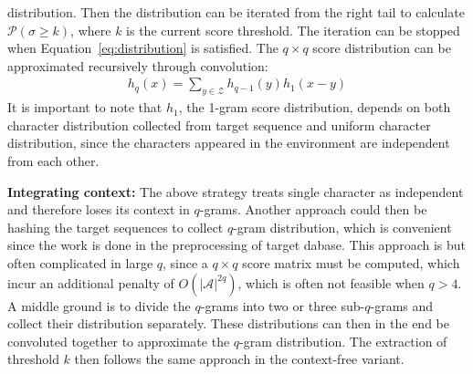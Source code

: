 \documentclass[twoside,a4paper,bsc]{master}
\newcommand{\Qgram}[1]{\(#1\)-gram}
\newcommand{\Alpha}[0]{\mathcal{A}}
\begin{document}
distribution. Then the distribution can be iterated from the right tail to
calculate \(\mathcal{P}(\sigma \geq k)\), where \(k\) is the current score
threshold. The iteration can be stopped when Equation~\ref{eq:distribution}
is satisfied.
The \(q\times q\) score distribution can be approximated recursively
through convolution:
\begin{align}
h_{q}(x) = \sum_{y\in\mathcal{Z}} h_{q-1}(y)h_1(x-y)
\label{equation:convolution}
\end{align}
It is important to note that \(h_1\), the 1-gram score distribution,
depends on both character distribution collected from target sequence and
uniform character distribution, since the characters appeared in the
environment are independent from each other.

\textbf{Integrating context:} The above strategy treats single character as
independent and therefore loses its context in \Qgram{q}s. Another
approach could then be hashing the target sequences to collect \Qgram{q}
distribution, which is convenient since the work is done in the
preprocessing of target dabase. This approach is but often complicated in
large \(q\), since a \(q\times q\) score matrix must be computed, which
incur an additional penalty of \(O(|\Alpha|^{2q})\), which is often
not feasible when \(q>4\). A middle ground is to divide the \Qgram{q}s
into two or three sub-\Qgram{q}s and collect their distribution
separately. These distributions can then in the end be convoluted together
to approximate the \Qgram{q} distribution. The extraction of threshold
\(k\) then follows the same approach in the context-free variant.
\end{document}
